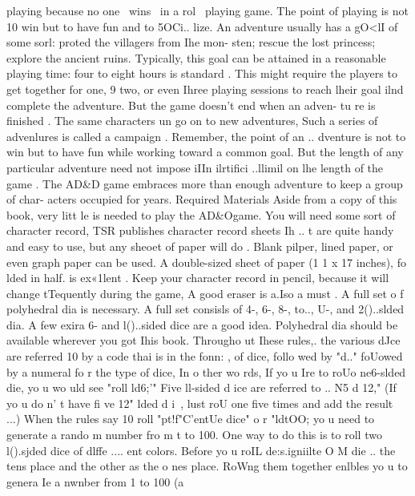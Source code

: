 \documentclass[../main.tex]{subfiles}
\begin{document}
\begin{multicols}{3}
		playing because no one ~wins~ in a rol~
		playing game. The point of playing is not 10
		win but to have fun and to 5OCi.. lize.
		An adventure usually has a gO<lI of some
		sorl: proted the villagers from Ihe mon-
		sten; rescue the lost princess; explore the
		ancient ruins. Typically, this goal can be
		attained in a reasonable playing time: four
		to eight hours is standard . This might
		require the players to get together for one,
		9
		two, or even Ihree playing sessions to reach
		lheir goal ilnd complete the adventure.
		But the game doesn't end when an adven-
		tu re is finished . The same characters un go
		on to new adventures, Such a series of
		advenlures is called a campaign .
		Remember, the point of an .. dventure is
		not to win but to have fun while working
		toward a common goal. But the length of
		any particular adventure need not impose
		iIIn ilrtifici ..llimil on lhe length of the game .
		The AD\&D\textsuperscript{\textregistered} game embraces more than
		enough adventure to keep a group of char-
		acters occupied for years.
		Required Materials
		Aside from a copy
		of this book, very litt le is needed to play the
		AD\&Ogame.
		You will need some sort of character
		record, TSR publishes character record
		sheets Ih .. t are quite handy and easy to use,
		but any sheoet of paper will do . Blank pilper,
		lined paper, or even graph paper can be
		used. A double-sized sheet of paper (1 1 x 17
		inches), fo lded in half. is ex«1lent . Keep
		your character record in pencil, because it
		will change tTequently during the game, A
		good eraser is a.Iso a must .
		A full set o f polyhedral dia is necessary.
		A full set consisls of 4-, 6-, 8-, to.., U-, and
		2()..slded dia. A few exira 6- and l()..sided
		dice are a good idea. Polyhedral dia should
		be available wherever you got Ihis book.
		Througho ut Ihese rules,. the various dJce
		are referred 10 by a code thai is in the fonn:
		, of dice, follo wed by "d.." foUowed by a
		numeral fo r the type of dice, In o ther
		wo rds, If yo u Ire to roUo ne6-slded die, yo u
		wo uld see "roll ld6;'" Five ll-sided d ice are
		referred to .. N5 d 12," (If yo u do n' t have fi ve
		12" lded d i~, lust roU one five times and
		add the result ...)
		When the rules say 10 roll "pt!f"C'entUe
		dice" o r "ldtOO; yo u need to generate a
		rando m number fro m t to 100. One way to
		do this is to roll two l().sjded dice of dlffe ....
		ent colors. Before yo u roIL de:s.igniilte O M
		die .. the tens place and the other as the
		o nes place. RoWng them together enlbles
		yo u to genera Ie a nwnber from 1 to 100 (a

\end{multicols}
\end{document}
